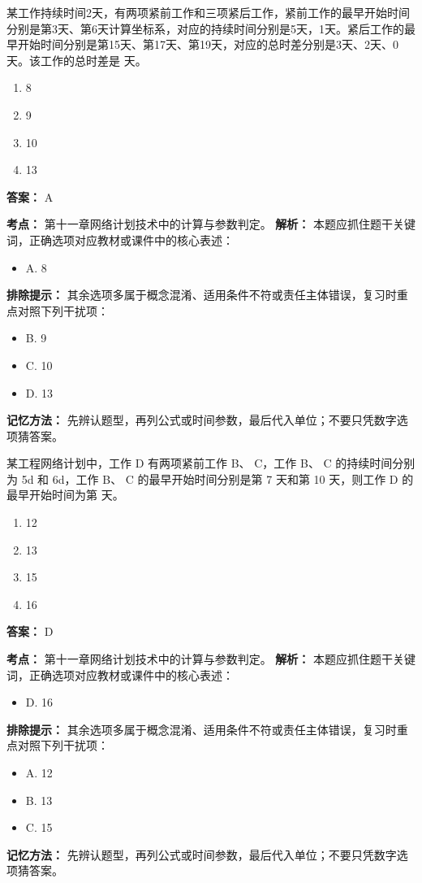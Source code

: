 \documentclass[UTF8,fontset=fandol,11pt]{ctexart}
\begin{document}
\begin{quizbox}[title={第 5 题}]
某工作持续时间2天，有两项紧前工作和三项紧后工作，紧前工作的最早开始时间分别是第3天、第6天计算坐标系，对应的持续时间分别是5天，1天。紧后工作的最早开始时间分别是第15天、第17天、第19天，对应的总时差分别是3天、2天、0天。该工作的总时差是 天。\\
\begin{enumerate}[label=\Alph*.]
\item 8
\item 9
\item 10
\item 13
\end{enumerate}
\textbf{答案：} A
\vspace{0.25em}
\begin{answerbox}[title={考点解析}]
\textbf{考点：} 第十一章网络计划技术中的计算与参数判定。
\textbf{解析：} 本题应抓住题干关键词，正确选项对应教材或课件中的核心表述：
\begin{itemize}
\item A. 8
\end{itemize}
\textbf{排除提示：} 其余选项多属于概念混淆、适用条件不符或责任主体错误，复习时重点对照下列干扰项：
\begin{itemize}
\item B. 9
\item C. 10
\item D. 13
\end{itemize}
\textbf{记忆方法：} 先辨认题型，再列公式或时间参数，最后代入单位；不要只凭数字选项猜答案。
\end{answerbox}
\end{quizbox}

\begin{quizbox}[title={第 6 题}]
某工程网络计划中，工作 D 有两项紧前工作 B、 C，工作 B、 C 的持续时间分别为 5d 和 6d，工作 B、 C 的最早开始时间分别是第 7 天和第 10 天，则工作 D 的最早开始时间为第 天。\\
\begin{enumerate}[label=\Alph*.]
\item 12
\item 13
\item 15
\item 16
\end{enumerate}
\textbf{答案：} D
\vspace{0.25em}
\begin{answerbox}[title={考点解析}]
\textbf{考点：} 第十一章网络计划技术中的计算与参数判定。
\textbf{解析：} 本题应抓住题干关键词，正确选项对应教材或课件中的核心表述：
\begin{itemize}
\item D. 16
\end{itemize}
\textbf{排除提示：} 其余选项多属于概念混淆、适用条件不符或责任主体错误，复习时重点对照下列干扰项：
\begin{itemize}
\item A. 12
\item B. 13
\item C. 15
\end{itemize}
\textbf{记忆方法：} 先辨认题型，再列公式或时间参数，最后代入单位；不要只凭数字选项猜答案。
\end{answerbox}
\end{quizbox}
\end{document}
